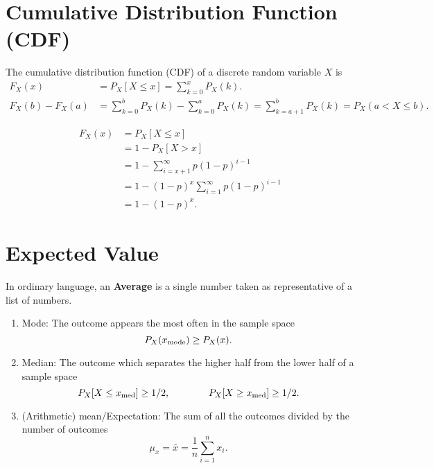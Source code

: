 \section{Cumulative Distribution Function (CDF)}
\begin{definition}
    The cumulative distribution function (CDF) of a discrete random variable $X$ is
    \begin{align*}
        F_X(x)&=P_X[X\leq x]=\sum_{k=0}^{x}P_X(k). \\
        F_X(b)-F_X(a)&=\sum_{k=0}^{b}P_X(k)-\sum_{k=0}^{a}P_X(k)=\sum_{k=a+1}^{b}P_X(k)=P_X(a<X\leq b).
    \end{align*}
\end{definition}

\begin{theorem}
    \begin{align*}
        F_X(x)
        &= P_X[X\leq x] \\
        &= 1-P_X[X > x] \\
        &= 1-\sum_{i=x+1}^{\infty}p(1-p)^{i-1} \\
        &= 1-(1-p)^x\sum_{i=1}^{\infty}p(1-p)^{i-1} \\
        &= 1-(1-p)^x.
    \end{align*}
\end{theorem}

\section{Expected Value}
\begin{definition}
    [Average]
    In ordinary language, an \textbf{Average} is a single number taken as representative of a list of numbers.
    \begin{enumerate}
        \item Mode: The outcome appears the most often in the sample space \[P_X(x_{\textnormal{mode}})\geq P_X(x).\]
        \item Median: The outcome which separates the higher half from  the lower half of a sample space \[P_X[X \leq x_{\textnormal{med}}] \geq 1/2, \qquad \qquad P_X[X \geq x_{\textnormal{med}}] \geq 1/2.\]
        \item (Arithmetic) mean/Expectation:  The sum of all the outcomes divided by the number of outcomes \[\mu_x = \bar{x} = \frac{1}{n}\sum_{i=1}^{n}x_i.\]
    \end{enumerate}
\end{definition}

